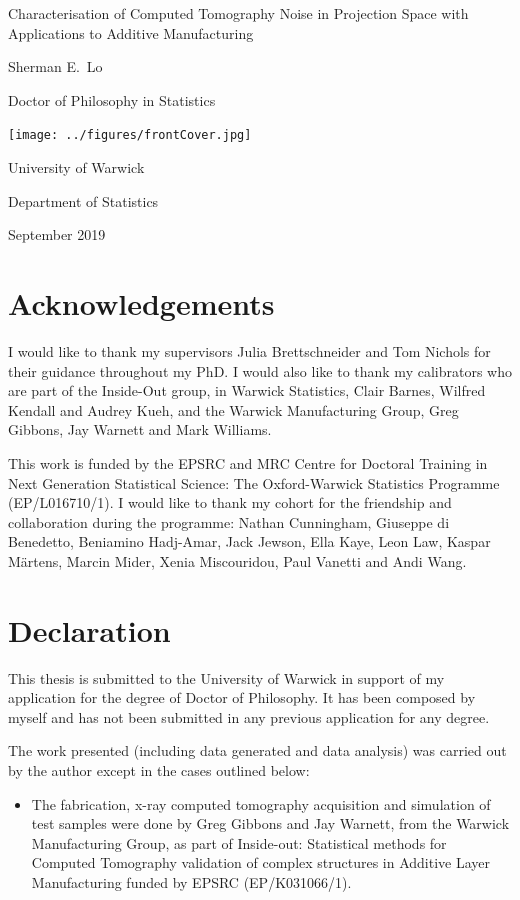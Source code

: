 \documentclass[12pt, a4paper, oneside]{memoir}
\begin{document}
\sloppy

\begin{titlingpage}
\centering
{\LARGE Characterisation of Computed Tomography Noise in Projection Space with Applications to Additive Manufacturing \par}
\vspace{1cm}
{\Large Sherman E.~Lo\par}
{\Large Doctor of Philosophy in Statistics\par}
\vfill
\texttt{[image: ../figures/frontCover.jpg]}
\vfill
{\Large University of Warwick\par}
{\Large Department of Statistics\par}
{\Large September 2019\par}
\end{titlingpage}


\frontmatter

\cleardoublepage
\tableofcontents*
\cleardoublepage
\listoffigures
\cleardoublepage
\listoftables

\chapter{Acknowledgements}
I would like to thank my supervisors Julia Brettschneider and Tom Nichols for their guidance throughout my PhD. I would also like to thank my calibrators who are part of the Inside-Out group, in Warwick Statistics, Clair Barnes, Wilfred Kendall and Audrey Kueh, and the Warwick Manufacturing Group, Greg Gibbons, Jay Warnett and Mark Williams.

This work is funded by the EPSRC and MRC Centre for Doctoral Training in Next Generation Statistical Science: The Oxford-Warwick Statistics Programme (EP/L016710/1). I would like to thank my cohort for the friendship and collaboration during the programme: Nathan Cunningham, Giuseppe di Benedetto, Beniamino Hadj-Amar, Jack Jewson, Ella Kaye, Leon Law, Kaspar M\"{a}rtens, Marcin Mider, Xenia Miscouridou, Paul Vanetti and Andi Wang.

\chapter{Declaration}
This thesis is submitted to the University of Warwick in support of my application for the degree of Doctor of Philosophy. It has been composed by myself and has not been submitted in any previous application for any degree.

The work presented (including data generated and data analysis) was carried out by the author except in the cases outlined below:
\begin{itemize}
  \item The fabrication, x-ray computed tomography acquisition and simulation of test samples were done by Greg Gibbons and Jay Warnett, from the Warwick Manufacturing Group, as part of Inside-out: Statistical methods for Computed Tomography validation of complex structures in Additive Layer Manufacturing funded by EPSRC (EP/K031066/1).
\end{itemize}
\end{document}
